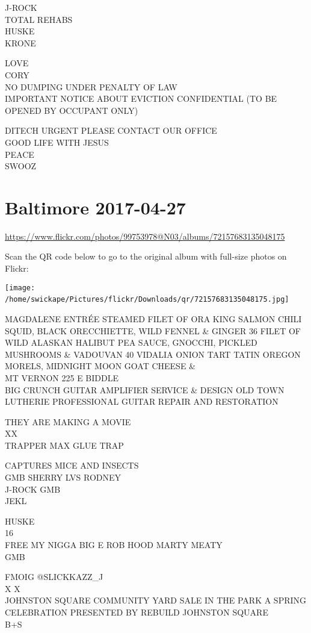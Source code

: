 \documentclass[10pt,letterpaper]{article}
\begin{document}
J{-}ROCK\\
TOTAL REHABS\\
HUSKE\\
KRONE

LOVE\\
CORY\\
NO DUMPING UNDER PENALTY OF LAW\\
IMPORTANT NOTICE ABOUT EVICTION CONFIDENTIAL (TO BE OPENED BY OCCUPANT ONLY)

DITECH URGENT PLEASE CONTACT OUR OFFICE\\
GOOD LIFE WITH JESUS\\
PEACE\\
SWOOZ
\

\section*{Baltimore 2017-04-27}

\url{https://www.flickr.com/photos/99753978@N03/albums/72157683135048175}

Scan the QR code below to go to the original album with full-size photos on Flickr:

\texttt{[image: /home/swickape/Pictures/flickr/Downloads/qr/72157683135048175.jpg]}
\

MAGDALENE ENTRÉE STEAMED FILET OF ORA KING SALMON CHILI SQUID, BLACK ORECCHIETTE, WILD FENNEL \& GINGER 36 FILET OF WILD ALASKAN HALIBUT PEA SAUCE, GNOCCHI, PICKLED MUSHROOMS \& VADOUVAN 40 VIDALIA ONION TART TATIN OREGON MORELS, MIDNIGHT MOON GOAT CHEESE \&\\
MT VERNON 225 E BIDDLE\\
BIG CRUNCH GUITAR AMPLIFIER SERVICE \& DESIGN OLD TOWN LUTHERIE PROFESSIONAL GUITAR REPAIR AND RESTORATION

THEY ARE MAKING A MOVIE\\
XX\\
TRAPPER MAX GLUE TRAP

CAPTURES MICE AND INSECTS\\
GMB SHERRY LVS RODNEY\\
J{-}ROCK GMB\\
JEKL

HUSKE\\
16\\
FREE MY NIGGA BIG E ROB HOOD MARTY MEATY\\
GMB

FMOIG @SLICKKAZZ\_J\\
X X\\
JOHNSTON SQUARE COMMUNITY YARD SALE IN THE PARK A SPRING CELEBRATION PRESENTED BY REBUILD JOHNSTON SQUARE\\
B+S
\end{document}
